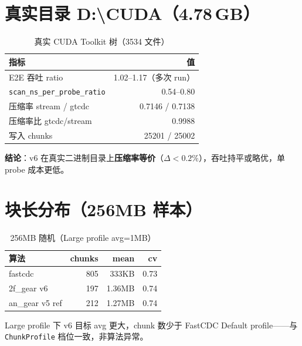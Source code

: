 \section{真实目录 D:\textbackslash CUDA（4.78\,GB）}

\begin{table}[htbp]
\centering
\caption{真实 CUDA Toolkit 树（3534 文件）}
\small
\begin{tabular}{@{}lr@{}}
\toprule
指标 & 值 \\
\midrule
E2E 吞吐 ratio & 1.02--1.17（多次 run） \\
\texttt{scan\_ns\_per\_probe\_ratio} & 0.54--0.80 \\
压缩率 stream / gtcdc & 0.7146 / 0.7138 \\
压缩率比 gtcdc/stream & 0.9988 \\
写入 chunks & 25201 / 25002 \\
\bottomrule
\end{tabular}
\end{table}

\textbf{结论}：v6 在真实二进制目录上\textbf{压缩率等价}（$\Delta<0.2\%$），吞吐持平或略优，单 probe 成本更低。

\section{块长分布（256MB 样本）}

\begin{table}[htbp]
\centering
\caption{256MB 随机（Large profile avg=1MB）}
\small
\begin{tabular}{@{}lrrr@{}}
\toprule
算法 & chunks & mean & cv \\
\midrule
fastcdc & 805 & 333KB & 0.73 \\
2f\_gear v6 & 197 & 1.36MB & 0.74 \\
an\_gear v5 ref & 212 & 1.27MB & 0.74 \\
\bottomrule
\end{tabular}
\end{table}

Large profile 下 v6 目标 avg 更大，chunk 数少于 FastCDC Default profile——与 \texttt{ChunkProfile} 档位一致，非算法异常。
